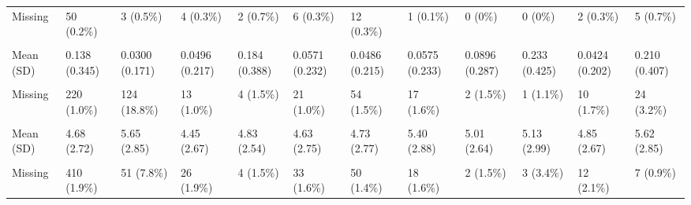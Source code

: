 \documentclass[
  single column]{article}
\begin{document}
\begin{landscape}
\begin{longtable}[t]{llllllllllll}
Missing & 50 (0.2\%) & 3 (0.5\%) & 4 (0.3\%) & 2 (0.7\%) & 6 (0.3\%) & 12 (0.3\%) & 1 (0.1\%) & 0 (0\%) & 0 (0\%) & 2 (0.3\%) & 5 (0.7\%)\\
\cellcolor{gray!10}{Non-Heterosexual Orientation (Yes/No)} & \cellcolor{gray!10}{} & \cellcolor{gray!10}{} & \cellcolor{gray!10}{} & \cellcolor{gray!10}{} & \cellcolor{gray!10}{} & \cellcolor{gray!10}{} & \cellcolor{gray!10}{} & \cellcolor{gray!10}{} & \cellcolor{gray!10}{} & \cellcolor{gray!10}{} & \cellcolor{gray!10}{}\\
Mean (SD) & 0.138 (0.345) & 0.0300 (0.171) & 0.0496 (0.217) & 0.184 (0.388) & 0.0571 (0.232) & 0.0486 (0.215) & 0.0575 (0.233) & 0.0896 (0.287) & 0.233 (0.425) & 0.0424 (0.202) & 0.210 (0.407)\\
\addlinespace
\cellcolor{gray!10}{Median [Min, Max]} & \cellcolor{gray!10}{0 [0, 1.00]} & \cellcolor{gray!10}{0 [0, 1.00]} & \cellcolor{gray!10}{0 [0, 1.00]} & \cellcolor{gray!10}{0 [0, 1.00]} & \cellcolor{gray!10}{0 [0, 1.00]} & \cellcolor{gray!10}{0 [0, 1.00]} & \cellcolor{gray!10}{0 [0, 1.00]} & \cellcolor{gray!10}{0 [0, 1.00]} & \cellcolor{gray!10}{0 [0, 1.00]} & \cellcolor{gray!10}{0 [0, 1.00]} & \cellcolor{gray!10}{0 [0, 1.00]}\\
Missing & 220 (1.0\%) & 124 (18.8\%) & 13 (1.0\%) & 4 (1.5\%) & 21 (1.0\%) & 54 (1.5\%) & 17 (1.6\%) & 2 (1.5\%) & 1 (1.1\%) & 10 (1.7\%) & 24 (3.2\%)\\
\cellcolor{gray!10}{New Zealand Depression Index 2018} & \cellcolor{gray!10}{} & \cellcolor{gray!10}{} & \cellcolor{gray!10}{} & \cellcolor{gray!10}{} & \cellcolor{gray!10}{} & \cellcolor{gray!10}{} & \cellcolor{gray!10}{} & \cellcolor{gray!10}{} & \cellcolor{gray!10}{} & \cellcolor{gray!10}{} & \cellcolor{gray!10}{}\\
Mean (SD) & 4.68 (2.72) & 5.65 (2.85) & 4.45 (2.67) & 4.83 (2.54) & 4.63 (2.75) & 4.73 (2.77) & 5.40 (2.88) & 5.01 (2.64) & 5.13 (2.99) & 4.85 (2.67) & 5.62 (2.85)\\
\cellcolor{gray!10}{Median [Min, Max]} & \cellcolor{gray!10}{4.00 [1.00, 10.0]} & \cellcolor{gray!10}{6.00 [1.00, 10.0]} & \cellcolor{gray!10}{4.00 [1.00, 10.0]} & \cellcolor{gray!10}{5.00 [1.00, 10.0]} & \cellcolor{gray!10}{4.00 [1.00, 10.0]} & \cellcolor{gray!10}{4.00 [1.00, 10.0]} & \cellcolor{gray!10}{5.00 [1.00, 10.0]} & \cellcolor{gray!10}{5.00 [1.00, 10.0]} & \cellcolor{gray!10}{5.00 [1.00, 10.0]} & \cellcolor{gray!10}{5.00 [1.00, 10.0]} & \cellcolor{gray!10}{6.00 [1.00, 10.0]}\\
\addlinespace
Missing & 410 (1.9\%) & 51 (7.8\%) & 26 (1.9\%) & 4 (1.5\%) & 33 (1.6\%) & 50 (1.4\%) & 18 (1.6\%) & 2 (1.5\%) & 3 (3.4\%) & 12 (2.1\%) & 7 (0.9\%)\\

\end{longtable}
\end{landscape}
\end{document}
